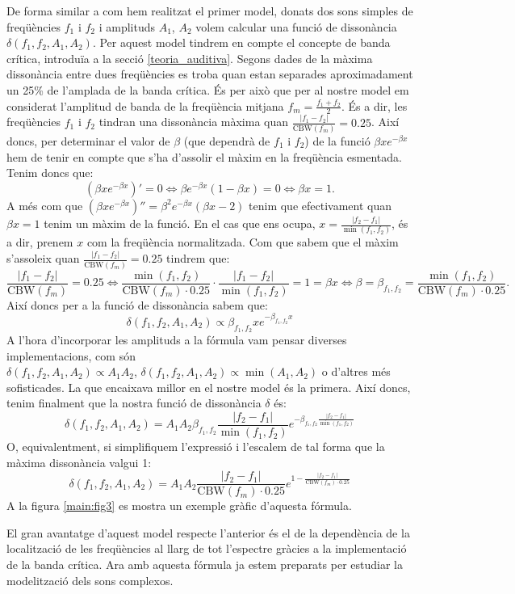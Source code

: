 \documentclass{article}
\theoremstyle{math}
\newcommand{\0}{\ensuremath{\vb{0}}}
\begin{document}
De forma similar a com hem realitzat el primer model, donats dos sons simples de freqüències $f_1$ i $f_2$ i amplituds $A_1$, $A_2$ volem calcular una funció de dissonància $\delta(f_1,f_2,A_1,A_2)$. Per aquest model tindrem en compte el concepte de banda crítica, introduïa a la secció \ref{teoria_auditiva}. Segons dades de \cite{zwicker} la màxima dissonància entre dues freqüències es troba quan estan separades aproximadament un 25\% de l'amplada de la banda crítica. És per això que per al nostre model em considerat l'amplitud de banda de la freqüència mitjana $f_m=\frac{f_1+f_2}{2}$. És a dir, les freqüències $f_1$ i $f_2$ tindran una dissonància màxima quan $\frac{|f_1-f_2|}{\text{CBW}(f_m)}=0.25$. Així doncs, per determinar el valor de $\beta$ (que dependrà de $f_1$ i $f_2$) de la funció $\beta xe^{-\beta x}$ hem de tenir en compte que s'ha d'assolir el màxim en la freqüència esmentada. Tenim doncs que:
$$\left(\beta xe^{-\beta x}\right)'=0\iff \beta e^{-\beta x}(1-\beta x)=0\iff\beta x=1.$$ A més com que $\left(\beta xe^{-\beta x}\right)''=\beta^2e^{-\beta x}(\beta x-2)$ tenim que efectivament quan $\beta x=1$ tenim un màxim de la funció.
En el cas que ens ocupa, $x=\frac{|f_2-f_1|}{\min(f_1,f_2)}$, és a dir, prenem $x$ com la freqüència normalitzada. Com que sabem que el màxim s'assoleix quan $\frac{|f_1-f_2|}{\text{CBW}(f_m)}=0.25$ tindrem que:
$$\frac{|f_1-f_2|}{\text{CBW}(f_m)}=0.25\iff\frac{\min(f_1, f_2)}{\text{CBW}(f_m)\cdot 0.25}\cdot\frac{|f_1-f_2|}{\min(f_1, f_2)}=1=\beta x\iff\beta=\beta_{f_1,f_2}=\frac{\min(f_1, f_2)}{\text{CBW}(f_m)\cdot 0.25}.$$
Així doncs per a la funció de dissonància sabem que: $$\delta(f_1,f_2,A_1,A_2)\propto\beta_{f_1,f_2}xe^{-\beta_{f_1,f_2}x}$$ A l'hora d'incorporar les amplituds a la fórmula vam pensar diverses implementacions, com són \\$\delta(f_1,f_2,A_1,A_2)\propto A_1A_2$, $\delta(f_1,f_2,A_1,A_2)\propto \min(A_1, A_2)$ o d'altres més sofisticades. La que encaixava millor en el nostre model és la primera. Així doncs, tenim finalment que la nostra funció de dissonància $\delta$ és:$$\delta(f_1,f_2,A_1,A_2)=A_1A_2\beta_{f_1,f_2}\frac{|f_2-f_1|}{\min(f_1,f_2)}e^{-\beta_{f_1,f_2}\frac{|f_2-f_1|}{\min(f_1,f_2)}}$$
O, equivalentment, si simplifiquem l'expressió i l'escalem de tal forma que la màxima dissonància valgui 1: 
\begin{equation}
    \delta(f_1,f_2,A_1,A_2)=A_1A_2\frac{|f_2-f_1|}{\text{CBW}(f_m)\cdot 0.25}e^{1-\frac{|f_2-f_1|}{\text{CBW}(f_m)\cdot 0.25}}
    \label{for:dissonancia}
\end{equation}
A la figura \ref{main:fig3} es mostra un exemple gràfic d'aquesta fórmula.
\begin{center}
    
    \label{main:fig3}
\end{center}
El gran avantatge d'aquest model respecte l'anterior és el de la dependència de la localització de les freqüències al llarg de tot l'espectre gràcies a la implementació de la banda crítica. Ara amb aquesta fórmula ja estem preparats per estudiar la modelització dels sons complexos.
\end{document}
